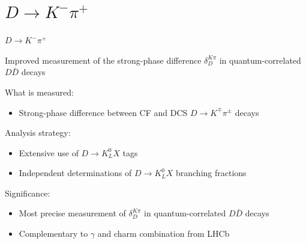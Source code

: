 \documentclass{beamer}
\begin{document}
\section{\texorpdfstring{$D\to K^-\pi^+$}{D2Kpi}}
\begin{frame}{$D\to K^-\pi^+$}
\begin{tcolorbox}[enhanced,frame style image=blueshade_cropped.png,
  opacityback=0.75,opacitybacktitle=0.25,
  colback=blue!5!white,colframe=blue!75!black,
  title=\color{white}{\href{https://link.springer.com/article/10.1140/epjc/s10052-022-10872-2}{\color{white}{EPJC \textbf{82} 1009 (2022)}}}]
  {\Large Improved measurement of the strong-phase difference $\delta_D^{K\pi}$ in quantum-correlated $D\bar{D}$ decays}
\end{tcolorbox}
  What is measured:
  \begin{itemize}
    \item{Strong-phase difference between CF and DCS $D\to K^\mp\pi^\pm$ decays}
  \end{itemize}
  Analysis strategy:
  \begin{itemize}
    \item{Extensive use of $D\to K_L^0X$ tags}
    \item{Independent determinations of $D\to K_L^0X$ branching fractions}
  \end{itemize}
  Significance:
  \begin{itemize}
    \item{Most precise measurement of $\delta_D^{K\pi}$ in quantum-correlated $D\bar{D}$ decays}
    \item{Complementary to $\gamma$ and charm combination from LHCb}
  \end{itemize}
\end{frame}
\end{document}
